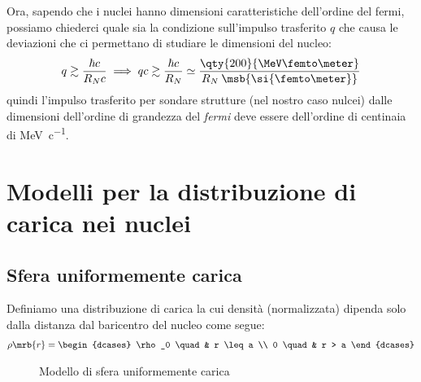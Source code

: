 Ora, sapendo che i nuclei hanno dimensioni caratteristiche dell'ordine del
fermi, possiamo chiederci quale sia la condizione sull'impulso trasferito $q$
che causa le deviazioni che ci permettano di studiare le dimensioni del nucleo:
\begin{equation}
	q \gtrsim \frac{\hbar c}{R_N c} \implies qc \gtrsim \frac{\hbar c}{R_N}
	\simeq \frac{\qty{200}{\MeV \femto\meter}}{R_N \: \msb{\si{\femto\meter}}}
\end{equation}
quindi l'impulso trasferito per sondare strutture (nel nostro caso nulcei)
dalle dimensioni dell'ordine di grandezza del \textit{fermi} deve essere
dell'ordine di centinaia di \si{\MeV \per c}.

\section{Modelli per la distribuzione di carica nei nuclei}
\subsection{Sfera uniformemente carica}
Definiamo una distribuzione di carica la cui densità (normalizzata) dipenda
solo dalla distanza dal baricentro del nucleo come segue:
\begin{align}
	\rho \mrb{r} =
	\begin{dcases}
		\rho_0 \quad & r \leq a \\
		0 \quad      & r > a
	\end{dcases}
	\label{eq:densita_carica_sfera_uniforme}
\end{align}

\begin{figure}[ht]
	\centering
	\caption{Modello di sfera uniformemente carica}
	\label{fig:modello_sfera_uniformemente_carica}
\end{figure}

